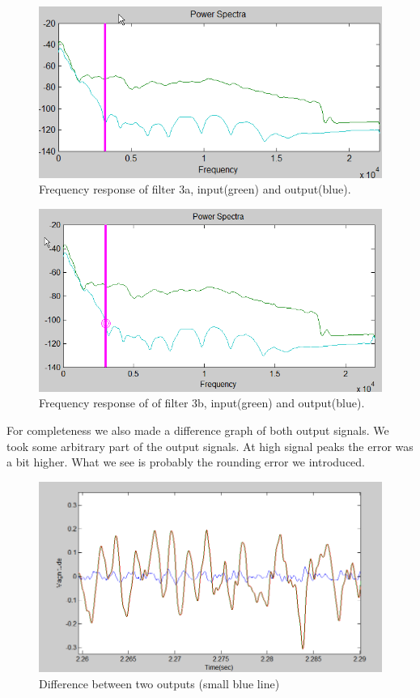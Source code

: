\documentclass[a4paper,twoside,11pt, fleqn]{article}
\begin{document}
\begin{figure}[h]
	\includegraphics[scale = 0.5]{Images/3a_powerspectra}
    \caption{Frequency response of filter 3a, input(green) and output(blue).}
\end{figure}

\begin{figure}[h]
	\includegraphics[scale = 0.45]{Images/3b_powerspectra}
    \caption{Frequency response of of filter 3b, input(green) and output(blue).}
\end{figure}
For completeness we also made a difference graph of both output signals. We took some arbitrary part of the output signals. At high signal peaks the error was a bit higher. What we see is probably the rounding error we introduced.

\begin{figure}[h]
	\includegraphics[scale = 0.55]{Images/3b_difference}
    \caption{Difference between two outputs (small blue line)}
\end{figure}
\end{document}
